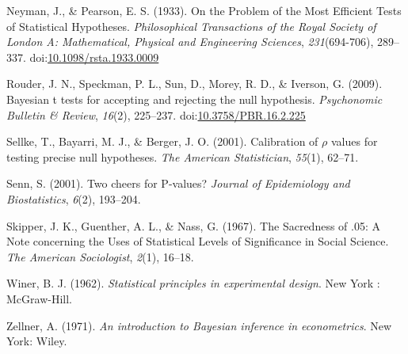 \documentclass[,jou,floatsintext]{apa6}
\begin{document}
\leavevmode\hypertarget{ref-neyman_problem_1933}{}%
Neyman, J., \& Pearson, E. S. (1933). On the Problem of the Most Efficient Tests of Statistical Hypotheses. \emph{Philosophical Transactions of the Royal Society of London A: Mathematical, Physical and Engineering Sciences}, \emph{231}(694-706), 289--337. doi:\href{https://doi.org/10.1098/rsta.1933.0009}{10.1098/rsta.1933.0009}

\leavevmode\hypertarget{ref-rouder_bayesian_2009}{}%
Rouder, J. N., Speckman, P. L., Sun, D., Morey, R. D., \& Iverson, G. (2009). Bayesian t tests for accepting and rejecting the null hypothesis. \emph{Psychonomic Bulletin \& Review}, \emph{16}(2), 225--237. doi:\href{https://doi.org/10.3758/PBR.16.2.225}{10.3758/PBR.16.2.225}

\leavevmode\hypertarget{ref-sellke_calibration_2001}{}%
Sellke, T., Bayarri, M. J., \& Berger, J. O. (2001). Calibration of \(\rho\) values for testing precise null hypotheses. \emph{The American Statistician}, \emph{55}(1), 62--71.

\leavevmode\hypertarget{ref-senn_two_2001}{}%
Senn, S. (2001). Two cheers for P-values? \emph{Journal of Epidemiology and Biostatistics}, \emph{6}(2), 193--204.

\leavevmode\hypertarget{ref-skipper_sacredness_1967}{}%
Skipper, J. K., Guenther, A. L., \& Nass, G. (1967). The Sacredness of .05: A Note concerning the Uses of Statistical Levels of Significance in Social Science. \emph{The American Sociologist}, \emph{2}(1), 16--18.

\leavevmode\hypertarget{ref-winer_statistical_1962}{}%
Winer, B. J. (1962). \emph{Statistical principles in experimental design}. New York : McGraw-Hill.

\leavevmode\hypertarget{ref-zellner_introduction_1971}{}%
Zellner, A. (1971). \emph{An introduction to Bayesian inference in econometrics}. New York: Wiley.
\end{document}
